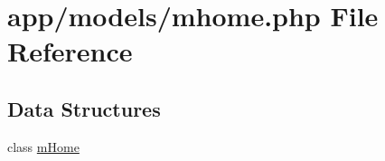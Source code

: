 \hypertarget{mhome_8php}{}\section{app/models/mhome.php File Reference}
\label{mhome_8php}
\subsection*{Data Structures}
\begin{DoxyCompactItemize}
\item 
class \hyperlink{classmHome}{m\+Home}
\end{DoxyCompactItemize}
